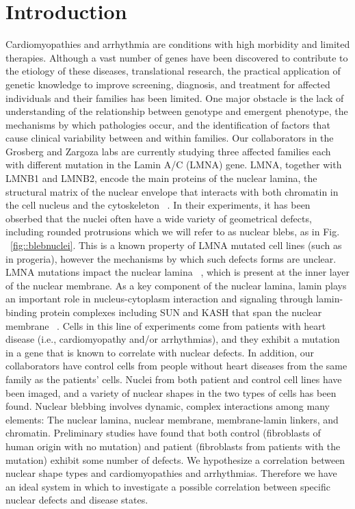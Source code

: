 \section{Introduction}
Cardiomyopathies and arrhythmia are conditions with high morbidity and limited therapies. Although a vast number of genes have been discovered to contribute to the etiology of these diseases, translational research, the practical application of genetic knowledge to improve screening, diagnosis, and treatment for affected individuals and their families has been limited. One major obstacle is the lack of understanding of the relationship between genotype and emergent phenotype, the mechanisms by which pathologies occur, and the identification of factors that cause clinical variability between and within families. Our collaborators in the Grosberg and Zargoza labs are currently studying three affected families each with different mutation in the Lamin A/C (LMNA) gene.  LMNA, together with LMNB1 and LMNB2, encode the main proteins of the nuclear lamina, the structural matrix of the nuclear envelope that interacts with both chromatin in the cell nucleus and the cytoskeleton ~\cite{Capell2006}. In their experiments, it has been obserbed that the nuclei often have a wide variety of geometrical defects, including rounded protrusions which we will refer to as nuclear blebs, as in Fig. ~\ref{fig::blebnuclei}. This is a known property of LMNA mutated cell lines (such as in progeria), however the mechanisms by which such defects forms are unclear. LMNA mutations impact the nuclear lamina ~\cite{Taimen2009, Worman2004}, which is present at the inner layer of the nuclear membrane. As a key component of the nuclear lamina, lamin plays an important role in nucleus-cytoplasm interaction and signaling through lamin-binding protein complexes including SUN and KASH that span the nuclear membrane ~\cite{Ho2012}. Cells in this line of experiments come from patients with heart disease (i.e., cardiomyopathy and/or arrhythmias), and they exhibit a mutation in a gene that is known to correlate with nuclear defects. In addition, our collaborators have control cells from people without heart diseases from the same family as the patients' cells.  Nuclei from both patient and control cell lines have been imaged, and  a variety of nuclear shapes in the two types of cells has been found. Nuclear blebbing involves dynamic, complex interactions among many elements: The nuclear lamina, nuclear membrane, membrane-lamin linkers, and chromatin. Preliminary studies have found that both control (fibroblasts of human origin with no mutation) and patient (fibroblasts from patients with the mutation) exhibit some number of defects. We hypothesize a correlation between nuclear shape types and cardiomyopathies and arrhythmias. Therefore we have an ideal system in which to investigate a possible correlation between specific nuclear defects and disease states.

